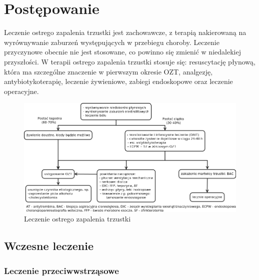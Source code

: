 \documentclass[a4paper, 12pt]{report}
\begin{document}
\chapter{Postępowanie}

Leczenie ostrego zapalenia trzustki jest zachowawcze, z terapią
nakierowaną na wyrównywanie zaburzeń występujących w przebiegu
choroby. Leczenie przyczynowe obecnie nie jest stosowane, co powinno
się zmienić w niedalekiej przyszłości. W terapii ostrego zapalenia
trzustki stosuje się: resuscytację płynową, która ma szczególne
znaczenie w pierwszym okresie OZT, analgezję, antybiotykoterapię,
leczenie żywieniowe, zabiegi endoskopowe oraz leczenie operacyjne.

\begin{figure}[!h]
\centering
\includegraphics[scale=0.4]{pan_ter}
\caption{Leczenie ostrego zapalenia trzustki}
\end{figure}

\section{Wczesne leczenie}

\subsection{Leczenie przeciwwstrząsowe}
\end{document}
